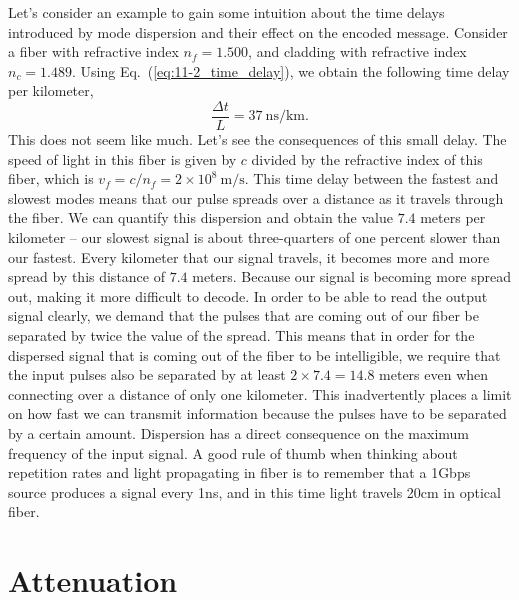 Let's consider an example to gain some intuition about the time delays introduced by mode dispersion and their effect on the encoded message.
Consider a fiber with refractive index $n_f = 1.500$, and cladding with refractive index $n_c = 1.489$.
Using Eq.~(\ref{eq:11-2_time_delay}), we obtain the following time delay per kilometer,
\begin{equation}
    \frac{\Delta t}{L}=37 \mathrm{~ns} / \mathrm{km}.
\end{equation}
This does not seem like much.
Let's see the consequences of this small delay.
The speed of light in this fiber is given by $c$ divided by the refractive index of this fiber, which is $v_f=c / n_f=2 \times 10^8 \mathrm{~m} / \mathrm{s}$.
This time delay between the fastest and slowest modes means that our pulse spreads over a distance as it travels through the fiber. We can quantify this dispersion and obtain the value $7.4$ meters per kilometer -- our slowest signal is about three-quarters of one percent slower than our fastest. Every kilometer that our signal travels, it becomes more and more spread by this distance of $7.4$ meters.
Because our signal is becoming more spread out, making it more difficult to decode.
In order to be able to read the output signal clearly, we demand that the pulses that are coming out of our fiber be separated by twice the value of the spread.
This means that in order for the dispersed signal that is coming out of the fiber to be intelligible, we require that the input pulses also be separated by at least $2\times 7.4 = 14.8$ meters even when connecting over a distance of only one kilometer.
This inadvertently places a limit on how fast we can transmit information because the pulses have to be separated by a certain amount.
Dispersion has a direct consequence on the maximum frequency of the input signal.
A good rule of thumb when thinking about repetition rates and light propagating in fiber is to remember that a 1Gbps source produces a signal every 1ns, and in this time light travels 20cm in optical fiber.




\section{Attenuation}
\label{sec:11-3_attenuation}

